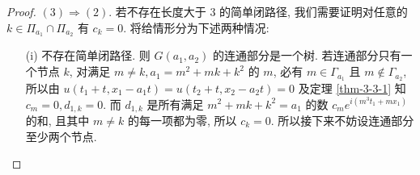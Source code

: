 \begin{proof}
\iffalse  不失一般性, 设 $G(a_1,a_2)$ 连通. 对 $G(a_1,a_2)$ 中的任意一个节点, 只有如图 \ref{fig:cross-graph-3} 所示的 $4$ 种情况. 
\begin{figure}[htbp]
    \centering
    \begin{tikzpicture}
        \draw (0,0) node[circle, fill, inner sep=1.5pt]{};
        \draw[red] (-1,0)--(1,0);
        \draw[blue] (0,-1)--(0,1);
        \draw (3,0) node[circle, fill, inner sep=1.5pt]{};
        \draw[blue] (3,0)--(3-0.5,1);
        \draw[red] (3,0)--(3+1,0);
        \draw[blue] (3,0)--(3-0.5,-1);
        \draw (3+3,0) node[circle, fill, inner sep=1.5pt]{};
        \draw[red] (3+3,0)--(3+3-0.5,1);
        \draw[blue] (3+3,0)--(3+1+3,0);
        \draw[red] (3+3,0)--(3+3-0.5,-1);
        \draw (3+3+3,0) node[circle, fill, inner sep=1.5pt]{};
        \draw[blue] (3+3+3,0)--(3+1+3+3,0);
        \draw[red]  (3+3+3,0)--(3-1+3+3,0);
    \end{tikzpicture}
    \caption{节点的四种情形}
    \label{fig:cross-graph-3}
\end{figure}
固定任意一点 $k_1$, 选择红色边前进到 $k_2$, 再由 $k_2$ 出发, 选择蓝色边前进到 $k_3$, 若 $k_3$ 与 $k_1$ 之间也有边, 则构成了边不同色的三角形, 这与 引理 \ref{lma-3-3-1} 矛盾. 所以按此步骤至少前 $3$ 个节点各不相同. 由于节点的四种情形均有两种颜色的边, 除非遇到先前经过的点, 否则该步骤可以一直持续下去. 由于节点个数的有限性, 必然存在第一个 $k_j$ 使得 $k_j=k_l$, $l<j-2$ (若 $l=j-2$, 则 $k_{j-1},k_{j-1},k_{j}$ 构成异色三角形), 则可得简单交错闭路径 $O(k_l,\cdots,k_j)$.
\fi
$(3)\Rightarrow (2)$. 若不存在长度大于 $3$ 的简单闭路径, 我们需要证明对任意的 $k\in \Pi_{a_1}\cap \Pi_{a_2}$ 有 $c_k=0$. 将给情形分为下述两种情况:
\begin{enumerate}
    \item [(i)] 不存在简单闭路径. 则 $G(a_1,a_2)$ 的连通部分是一个树. 若连通部分只有一个节点 $k$, 对满足 $m\neq k, a_1=m^2+mk+k^2$ 的 $m$, 必有 $m\in\Gamma_{a_1}$ 且 $m\notin \Gamma_{a_2}$, 所以由 $u(t_1+t,x_1-a_1t)=u(t_2+t,x_2-a_2t)=0$ 及定理 \ref{thm-3-3-1} 知 $c_{m}=0, d_{1,k}=0$. 而 $d_{1,k}$ 是所有满足 $m^2+mk+k^2=a_1$ 的数 $c_me^{i(m^3t_1+mx_1)}$ 的和, 且其中 $m\neq k$ 的每一项都为零, 所以 $c_{k}=0$. 所以接下来不妨设连通部分至少两个节点.
    

\end{enumerate}
\end{proof}
